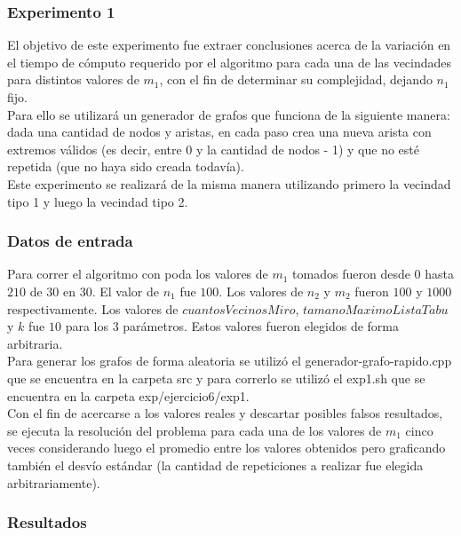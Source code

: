 	\subsubsection*{Experimento 1}\;
\noindent  El objetivo de este experimento fue extraer conclusiones acerca de la variación en el tiempo de cómputo requerido por el algoritmo para cada una de las vecindades para distintos valores de $m_1$, con el fin de determinar su complejidad, dejando $n_1$ fijo. \\
   Para ello se utilizará un generador de grafos que funciona de la siguiente manera: dada una cantidad de nodos y aristas, en cada paso crea una nueva arista con extremos válidos (es decir, entre 0 y la cantidad de nodos - 1) y que no esté repetida (que no haya sido creada todavía).\\
   Este experimento se realizará de la misma manera utilizando primero la vecindad tipo 1 y luego la vecindad tipo 2.
     	
\subsubsection*{Datos de entrada}\;
\noindent Para correr el algoritmo con poda los valores de $m_1$ tomados fueron desde $0$ hasta $210$ de $30$ en $30$. El valor de $n_1$ fue $100$. Los valores de $n_2$ y $m_2$ fueron $100$ y $1000$ respectivamente. Los valores de $cuantosVecinosMiro$, $tamanoMaximoListaTabu$ y $k$ fue $10$ para los $3$ parámetros. Estos valores fueron elegidos de forma arbitraria.\\
        Para generar los grafos de forma aleatoria se utilizó el generador-grafo-rapido.cpp que se encuentra en la carpeta src y para correrlo se utilizó el exp1.sh que se encuentra en la carpeta exp/ejercicio6/exp1. \\
        Con el fin de acercarse a los valores reales y descartar posibles falsos resultados, se ejecuta la resolución del problema para cada una de los valores de $m_1$ cinco veces considerando luego el promedio entre los valores obtenidos pero graficando también el desvío estándar (la cantidad de repeticiones a realizar fue elegida arbitrariamente).\; 
     	
\subsubsection*{Resultados}\;

